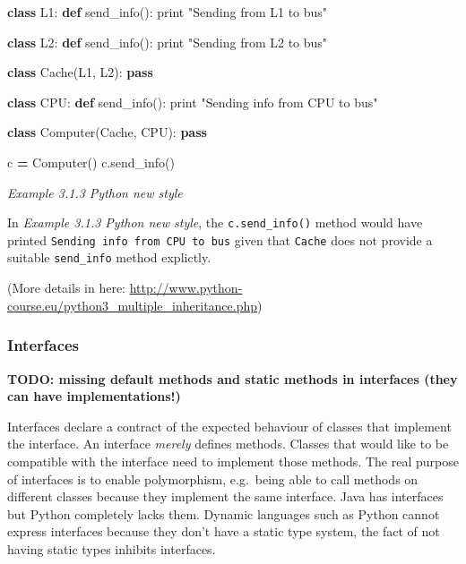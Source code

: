 \documentclass[]{article}
\newenvironment{Shaded}{\begin{snugshade}}{\end{snugshade}}
\newcommand{\KeywordTok}[1]{\textcolor[rgb]{0.13,0.29,0.53}{\textbf{{#1}}}}
\newcommand{\StringTok}[1]{\textcolor[rgb]{0.31,0.60,0.02}{{#1}}}
\newcommand{\ControlFlowTok}[1]{\textcolor[rgb]{0.13,0.29,0.53}{\textbf{{#1}}}}
\newcommand{\OperatorTok}[1]{\textcolor[rgb]{0.81,0.36,0.00}{\textbf{{#1}}}}
\newcommand{\BuiltInTok}[1]{{#1}}
\newcommand{\NormalTok}[1]{{#1}}
\begin{document}
\begin{Shaded}
\begin{Highlighting}[]
\KeywordTok{class} \NormalTok{L1:}
  \KeywordTok{def} \NormalTok{send_info():}
    \BuiltInTok{print} \StringTok{"Sending from L1 to bus"}

\KeywordTok{class} \NormalTok{L2:}
  \KeywordTok{def} \NormalTok{send_info():}
    \BuiltInTok{print} \StringTok{"Sending from L2 to bus"}

\KeywordTok{class} \NormalTok{Cache(L1, L2):}
  \ControlFlowTok{pass}

\KeywordTok{class} \NormalTok{CPU:}
  \KeywordTok{def} \NormalTok{send_info():}
    \BuiltInTok{print} \StringTok{"Sending info from CPU to bus"}

\KeywordTok{class} \NormalTok{Computer(Cache, CPU):}
  \ControlFlowTok{pass}

\NormalTok{c }\OperatorTok{=} \NormalTok{Computer()}
\NormalTok{c.send_info()}
\end{Highlighting}
\end{Shaded}

\emph{Example 3.1.3 Python new style}

In \emph{Example 3.1.3 Python new style}, the \texttt{c.send\_info()}
method would have printed \texttt{Sending\ info\ from\ CPU\ to\ bus}
given that \texttt{Cache} does not provide a suitable
\texttt{send\_info} method explictly.

(More details in here:
\url{http://www.python-course.eu/python3_multiple_inheritance.php})

\hypertarget{interfaces}{\subsubsection{Interfaces}\label{interfaces}}

\textbf{TODO: missing default methods and static methods in interfaces
(they can have implementations!)}

Interfaces declare a contract of the expected behaviour of classes that
implement the interface. An interface \emph{merely} defines methods.
Classes that would like to be compatible with the interface need to
implement those methods. The real purpose of interfaces is to enable
polymorphism, e.g.~being able to call methods on different classes
because they implement the same interface. Java has interfaces but
Python completely lacks them. Dynamic languages such as Python cannot
express interfaces because they don't have a static type system, the
fact of not having static types inhibits interfaces.
\end{document}
